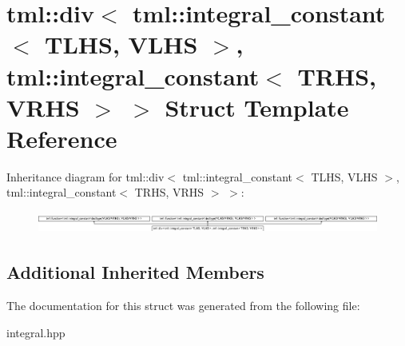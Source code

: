 \hypertarget{structtml_1_1div_3_01tml_1_1integral__constant_3_01TLHS_00_01VLHS_01_4_00_01tml_1_1integral__con79c58763995758c6c4d3761b0903632f}{\section{tml\+:\+:div$<$ tml\+:\+:integral\+\_\+constant$<$ T\+L\+H\+S, V\+L\+H\+S $>$, tml\+:\+:integral\+\_\+constant$<$ T\+R\+H\+S, V\+R\+H\+S $>$ $>$ Struct Template Reference}
\label{structtml_1_1div_3_01tml_1_1integral__constant_3_01TLHS_00_01VLHS_01_4_00_01tml_1_1integral__con79c58763995758c6c4d3761b0903632f}
}
Inheritance diagram for tml\+:\+:div$<$ tml\+:\+:integral\+\_\+constant$<$ T\+L\+H\+S, V\+L\+H\+S $>$, tml\+:\+:integral\+\_\+constant$<$ T\+R\+H\+S, V\+R\+H\+S $>$ $>$\+:\begin{figure}[H]
\begin{center}
\leavevmode
\includegraphics[height=0.716571cm]{structtml_1_1div_3_01tml_1_1integral__constant_3_01TLHS_00_01VLHS_01_4_00_01tml_1_1integral__con79c58763995758c6c4d3761b0903632f}
\end{center}
\end{figure}
\subsection*{Additional Inherited Members}


The documentation for this struct was generated from the following file\+:\begin{DoxyCompactItemize}
\item 
integral.\+hpp\end{DoxyCompactItemize}

